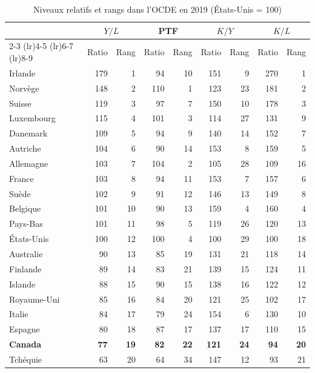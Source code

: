 \begin{table}[p]
\centering
\sffamily
\scriptsize
\setlength{\tabcolsep}{4.4pt}
\renewcommand{\arraystretch}{1.03}
\begin{threeparttable}
\caption{Niveaux relatifs et rangs dans l'OCDE en 2019 (États-Unis = 100)}
\label{tab:note_lp_levels}
\begin{tabular}{l *{4}{rr}}
\toprule
& \multicolumn{2}{c}{$Y/L$} & \multicolumn{2}{c}{PTF} & \multicolumn{2}{c}{$K/Y$} & \multicolumn{2}{c}{$K/L$} \\
\cmidrule(lr){2-3} \cmidrule(lr){4-5} \cmidrule(lr){6-7} \cmidrule(lr){8-9}
& Ratio & Rang & Ratio & Rang & Ratio & Rang & Ratio & Rang \\
\midrule
Irlande & 179 & 1 & 94 & 10 & 151 & 9 & 270 & 1 \\
Norvège & 148 & 2 & 110 & 1 & 123 & 23 & 181 & 2 \\
Suisse & 119 & 3 & 97 & 7 & 150 & 10 & 178 & 3 \\
Luxembourg & 115 & 4 & 101 & 3 & 114 & 27 & 131 & 9 \\
Danemark & 109 & 5 & 94 & 9 & 140 & 14 & 152 & 7 \\
Autriche & 104 & 6 & 90 & 14 & 153 & 8 & 159 & 5 \\
Allemagne & 103 & 7 & 104 & 2 & 105 & 28 & 109 & 16 \\
France & 103 & 8 & 94 & 11 & 153 & 7 & 157 & 6 \\
Suède & 102 & 9 & 91 & 12 & 146 & 13 & 149 & 8 \\
Belgique & 101 & 10 & 90 & 13 & 159 & 4 & 160 & 4 \\
Pays-Bas & 101 & 11 & 98 & 5 & 119 & 26 & 120 & 13 \\
États-Unis & 100 & 12 & 100 & 4 & 100 & 29 & 100 & 18 \\
Australie & 90 & 13 & 85 & 19 & 131 & 21 & 118 & 14 \\
Finlande & 89 & 14 & 83 & 21 & 139 & 15 & 124 & 11 \\
Islande & 88 & 15 & 90 & 15 & 138 & 16 & 122 & 12 \\
Royaume-Uni & 85 & 16 & 84 & 20 & 121 & 25 & 102 & 17 \\
Italie & 84 & 17 & 79 & 24 & 154 & 6 & 130 & 10 \\
Espagne & 80 & 18 & 87 & 17 & 137 & 17 & 110 & 15 \\
\textbf{Canada} & \textbf{77} & \textbf{19} & \textbf{82} & \textbf{22} & \textbf{121} & \textbf{24} & \textbf{94} & \textbf{20} \\
Tchéquie & 63 & 20 & 64 & 34 & 147 & 12 & 93 & 21 \\

\end{tabular}
\end{threeparttable}
\end{table}
